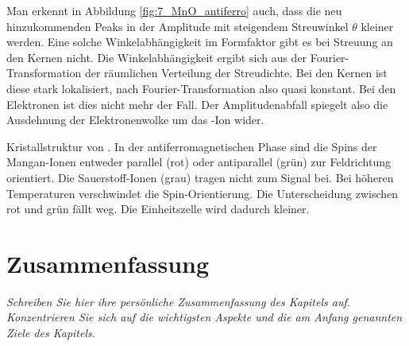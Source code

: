  Man erkennt in Abbildung \ref{fig:7_MnO_antiferro}  auch, dass die neu hinzukommenden Peaks in der Amplitude mit steigendem Streuwinkel $\theta$ kleiner werden. Eine solche Winkelabhängigkeit im Formfaktor gibt es bei Streuung an den Kernen nicht. Die Winkelabhängigkeit ergibt sich aus der Fourier-Transformation der räumlichen Verteilung der Streudichte. Bei den Kernen ist diese stark lokalisiert, nach Fourier-Transformation also quasi konstant. Bei den Elektronen ist dies nicht mehr der Fall. Der Amplitudenabfall spiegelt also die Ausdehnung der Elektronenwolke um das -Ion wider.

\begin{marginfigure}[-50mm]
    \caption{Kristallstruktur von . In der antiferromagnetischen Phase sind die Spins der Mangan-Ionen entweder parallel (rot) oder antiparallel (grün) zur Feldrichtung orientiert. Die Sauerstoff-Ionen (grau) tragen nicht zum Signal bei. Bei höheren Temperaturen verschwindet die Spin-Orientierung. Die Unterscheidung zwischen rot und grün fällt weg. Die Einheitszelle wird dadurch kleiner.}
\end{marginfigure}


    



\newpage
\section{Zusammenfassung}

\textit{Schreiben Sie hier ihre persönliche Zusammenfassung des Kapitels auf. Konzentrieren Sie sich auf die wichtigsten Aspekte und die am Anfang genannten Ziele des Kapitels.}

\vspace*{10cm}
\printbibliography[segment=\therefsegment,heading=subbibliography]
